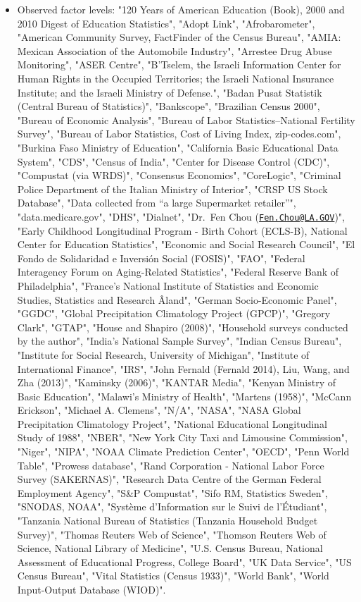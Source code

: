\documentclass[]{article}
\providecommand{\tightlist}{%
  \setlength{\itemsep}{0pt}\setlength{\parskip}{0pt}}
\begin{document}
\begin{itemize}
\tightlist
\item
  Observed factor levels: "120 Years of American Education (Book), 2000
  and 2010 Digest of Education Statistics", "Adopt Link",
  "Afrobarometer", "American Community Survey, FactFinder of the Census
  Bureau", "AMIA: Mexican Association of the Automobile Industry",
  "Arrestee Drug Abuse Monitoring", "ASER Centre", "B'Tselem, the
  Israeli Information Center for Human Rights in the Occupied
  Territories; the Israeli National Insurance Institute; and the Israeli
  Ministry of Defense.", "Badan Pusat Statistik (Central Bureau of
  Statistics)", "Bankscope", "Brazilian Census 2000", "Bureau of
  Economic Analysis", "Bureau of Labor Statistics--National Fertility
  Survey", "Bureau of Labor Statistics, Cost of Living Index,
  zip-codes.com", "Burkina Faso Ministry of Education", "California
  Basic Educational Data System", "CDS", "Census of India", "Center for
  Disease Control (CDC)", "Compustat (via WRDS)", "Consensus Economics",
  "CoreLogic", "Criminal Police Department of the Italian Ministry of
  Interior", "CRSP US Stock Database", "Data collected from ``a large
  Supermarket retailer''", "data.medicare.gov", "DHS", "Dialnet",
  "Dr.~Fen Chou
  (\href{mailto:Fen.Chou@LA.GOV}{\nolinkurl{Fen.Chou@LA.GOV}})", "Early
  Childhood Longitudinal Program - Birth Cohort (ECLS-B), National
  Center for Education Statistics", "Economic and Social Research
  Council", "El Fondo de Solidaridad e Inversión Social (FOSIS)", "FAO",
  "Federal Interagency Forum on Aging-Related Statistics", "Federal
  Reserve Bank of Philadelphia", "France's National Institute of
  Statistics and Economic Studies, Statistics and Research Âland",
  "German Socio-Economic Panel", "GGDC", "Global Precipitation
  Climatology Project (GPCP)", "Gregory Clark", "GTAP", "House and
  Shapiro (2008)", "Household surveys conducted by the author", "India's
  National Sample Survey", "Indian Census Bureau", "Institute for Social
  Research, University of Michigan", "Institute of International
  Finance", "IRS", "John Fernald (Fernald 2014), Liu, Wang, and Zha
  (2013)", "Kaminsky (2006)", "KANTAR Media", "Kenyan Ministry of Basic
  Education", "Malawi's Ministry of Health", "Martens (1958)", "McCann
  Erickson", "Michael A. Clemens", "N/A", "NASA", "NASA Global
  Precipitation Climatology Project", "National Educational Longitudinal
  Study of 1988", "NBER", "New York City Taxi and Limousine Commission",
  "Niger", "NIPA", "NOAA Climate Prediction Center", "OECD", "Penn World
  Table", "Prowess database", "Rand Corporation - National Labor Force
  Survey (SAKERNAS)", "Research Data Centre of the German Federal
  Employment Agency", "S\&P Compustat", "Sifo RM, Statistics Sweden",
  "SNODAS, NOAA", "Système d'Information sur le Suivi de l'Étudiant",
  "Tanzania National Bureau of Statistics (Tanzania Household Budget
  Survey)", "Thomas Reuters Web of Science", "Thomson Reuters Web of
  Science, National Library of Medicine", "U.S. Census Bureau, National
  Assessment of Educational Progress, College Board", "UK Data Service",
  "US Census Bureau", "Vital Statistics (Census 1933)", "World Bank",
  "World Input-Output Database (WIOD)".
\end{itemize}
\end{document}
